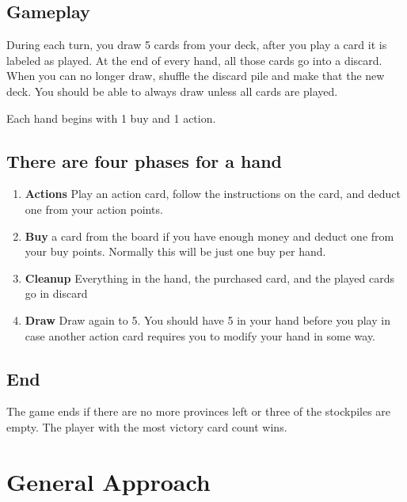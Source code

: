 \documentclass[11pt, oneside]{article}   	%
\begin{document}
\subsection{Gameplay}

During each turn, you draw 5 cards from your deck, after you play a card it is labeled as played. At the end of every hand, all those cards go into a discard. When you can no longer draw, shuffle the discard pile and make that the new deck. You should be able to always draw unless all cards are played. 

Each hand begins with 1 buy and 1 action. 


\subsection{There are four phases for a hand}

	\begin{enumerate}
 		 \item \textbf{Actions} Play an action card, follow the instructions on the card, and deduct one from your action points. 
  		 \item \textbf{Buy} a card from the board if you have enough money and deduct one from your buy points. Normally this will be just one buy per hand. 
		 \item \textbf{Cleanup} Everything in the hand, the purchased card, and the played cards go in discard
		 \item \textbf{Draw} Draw again to 5. You should have 5 in your hand before you play in case another action card requires you to modify your hand in some way. 
	\end{enumerate}


\subsection{End}

The game ends if there are no more provinces left or three of the stockpiles are empty. The player with the most victory card count wins. 

\section{General Approach}
\end{document}
